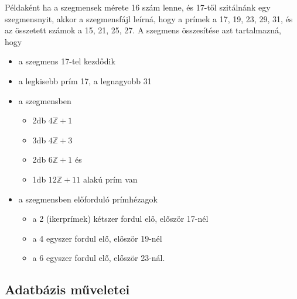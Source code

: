 Példaként ha a szegmensek mérete 16 szám lenne, és 17-től szitálnánk egy szegmensnyit, akkor a szegmensfájl leírná, hogy a prímek a 17, 19, 23, 29, 31, és az összetett számok a 15, 21, 25, 27.
A szegmens összesítése azt tartalmazná, hogy
\begin{itemize}
\item a szegmens 17-tel kezdődik
\item a legkisebb prím 17, a legnagyobb 31
\item a szegmensben
\begin{itemize}
\item 2db $4\mathbb{Z}+1$
\item 3db $4\mathbb{Z}+3$
\item 2db $6\mathbb{Z}+1$ és		
\item 1db $12\mathbb{Z}+11$ alakú prím van
\end{itemize}
\item a szegmensben előforduló prímhézagok
\begin{itemize}
\item a 2 (ikerprímek) kétszer fordul elő, először 17-nél
\item a 4 egyszer fordul elő, először 19-nél
\item a 6 egyszer fordul elő, először 23-nál.
\end{itemize}
\end{itemize}

\subsection{Adatbázis műveletei}

